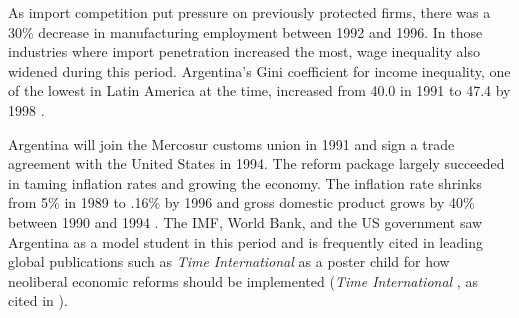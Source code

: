\documentclass[12pt,a4paper]{article}\usepackage[]{graphicx}\usepackage[]{color}
\begin{document}
As import competition put pressure on previously protected firms, there was a 30\% decrease in manufacturing employment between 1992 and 1996. In those industries where import penetration increased the most, wage inequality also widened during this period. Argentina's Gini coefficient for income inequality, one of the lowest in Latin America at the time, increased from 40.0 in 1991 to 47.4 by 1998 \parencites[505]{Galiani:2003fr}[11]{Beker:2011vq}.

Argentina will join the Mercosur customs union in 1991 and sign a trade agreement with the United States in 1994. The reform package largely succeeded in taming inflation rates and growing the economy. The inflation rate shrinks from 5\% in 1989 to .16\% by 1996 and gross domestic product grows by 40\% between 1990 and 1994 \parencite[4]{Beker:2011vq}. The IMF, World Bank, and the US government saw Argentina as a model student in this period \parencites[142]{Cavallo:2004bf}{Cavallo:2004ta}[167]{Klein:2002vg} and is frequently cited in leading global publications such as \emph{Time International} as a poster child for how neoliberal economic reforms should be implemented (\emph{Time International} \cite*{:3GmqDB3y}, as cited in \cites[194]{Echegaray:2001tf}{MarcusDelgado:2003gn}{Silverstein:2002wm}).
\end{document}
